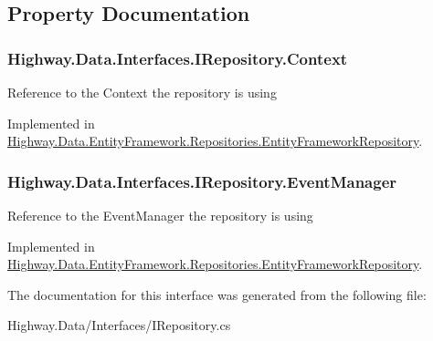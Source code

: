 \subsection{Property Documentation}
\hypertarget{interface_highway_1_1_data_1_1_interfaces_1_1_i_repository_aadf2e3d1d5b118f2fe6e2b1fc1ae8e77}{
\subsubsection[{Context}]{ Highway.\-Data.\-Interfaces.\-I\-Repository.\-Context\hspace{0.3cm}{\ttfamily [get]}}}\label{interface_highway_1_1_data_1_1_interfaces_1_1_i_repository_aadf2e3d1d5b118f2fe6e2b1fc1ae8e77}


Reference to the Context the repository is using 



Implemented in \hyperlink{class_highway_1_1_data_1_1_entity_framework_1_1_repositories_1_1_entity_framework_repository_a39447e7deb1284fc5e5d9ea7c2c78c63}{Highway.\-Data.\-Entity\-Framework.\-Repositories.\-Entity\-Framework\-Repository}.

\hypertarget{interface_highway_1_1_data_1_1_interfaces_1_1_i_repository_a2f76cda20f7e51ce44c11a077194c747}{
\subsubsection[{Event\-Manager}]{ Highway.\-Data.\-Interfaces.\-I\-Repository.\-Event\-Manager\hspace{0.3cm}{\ttfamily [get]}}}\label{interface_highway_1_1_data_1_1_interfaces_1_1_i_repository_a2f76cda20f7e51ce44c11a077194c747}


Reference to the Event\-Manager the repository is using 



Implemented in \hyperlink{class_highway_1_1_data_1_1_entity_framework_1_1_repositories_1_1_entity_framework_repository_abb629b7ba44c32a78951f64554f52e06}{Highway.\-Data.\-Entity\-Framework.\-Repositories.\-Entity\-Framework\-Repository}.



The documentation for this interface was generated from the following file\-:\begin{DoxyCompactItemize}
\item 
Highway.\-Data/\-Interfaces/I\-Repository.\-cs\end{DoxyCompactItemize}
